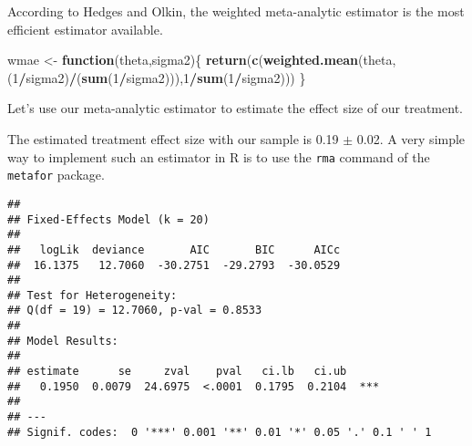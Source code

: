 \documentclass[]{book}
\newenvironment{Shaded}{\begin{snugshade}}{\end{snugshade}}
\newcommand{\KeywordTok}[1]{\textcolor[rgb]{0.13,0.29,0.53}{\textbf{#1}}}
\newcommand{\DataTypeTok}[1]{\textcolor[rgb]{0.13,0.29,0.53}{#1}}
\newcommand{\DecValTok}[1]{\textcolor[rgb]{0.00,0.00,0.81}{#1}}
\newcommand{\StringTok}[1]{\textcolor[rgb]{0.31,0.60,0.02}{#1}}
\newcommand{\ControlFlowTok}[1]{\textcolor[rgb]{0.13,0.29,0.53}{\textbf{#1}}}
\newcommand{\OperatorTok}[1]{\textcolor[rgb]{0.81,0.36,0.00}{\textbf{#1}}}
\newcommand{\NormalTok}[1]{#1}
\theoremstyle{definition}
\theoremstyle{definition}
\theoremstyle{definition}
\theoremstyle{remark}
\let\BeginKnitrBlock\begin \let\EndKnitrBlock\end
\begin{document}
\BeginKnitrBlock{remark}
\iffalse{} {Remark. } \fi{}According to Hedges and Olkin, the weighted
meta-analytic estimator is the most efficient estimator available.
\EndKnitrBlock{remark}

\begin{Shaded}
\begin{Highlighting}[]
\NormalTok{wmae <-}\StringTok{ }\ControlFlowTok{function}\NormalTok{(theta,sigma2)\{}
  \KeywordTok{return}\NormalTok{(}\KeywordTok{c}\NormalTok{(}\KeywordTok{weighted.mean}\NormalTok{(theta,(}\DecValTok{1}\OperatorTok{/}\NormalTok{sigma2)}\OperatorTok{/}\NormalTok{(}\KeywordTok{sum}\NormalTok{(}\DecValTok{1}\OperatorTok{/}\NormalTok{sigma2))),}\DecValTok{1}\OperatorTok{/}\KeywordTok{sum}\NormalTok{(}\DecValTok{1}\OperatorTok{/}\NormalTok{sigma2)))}
\NormalTok{\}}
\end{Highlighting}
\end{Shaded}

\BeginKnitrBlock{example}
\protect\hypertarget{exm:unnamed-chunk-145}{}{\label{exm:unnamed-chunk-145}
}Let's use our meta-analytic estimator to estimate the effect size of
our treatment.
\EndKnitrBlock{example} The estimated treatment effect size with our
sample is 0.19 \(\pm\) 0.02. A very simple way to implement such an
estimator in R is to use the \texttt{rma} command of the
\texttt{metafor} package.

\begin{Shaded}
\end{Shaded}

\begin{verbatim}
## 
## Fixed-Effects Model (k = 20)
## 
##   logLik  deviance       AIC       BIC      AICc  
##  16.1375   12.7060  -30.2751  -29.2793  -30.0529  
## 
## Test for Heterogeneity: 
## Q(df = 19) = 12.7060, p-val = 0.8533
## 
## Model Results:
## 
## estimate      se     zval    pval   ci.lb   ci.ub     
##   0.1950  0.0079  24.6975  <.0001  0.1795  0.2104  ***
## 
## ---
## Signif. codes:  0 '***' 0.001 '**' 0.01 '*' 0.05 '.' 0.1 ' ' 1
\end{verbatim}
\end{document}

